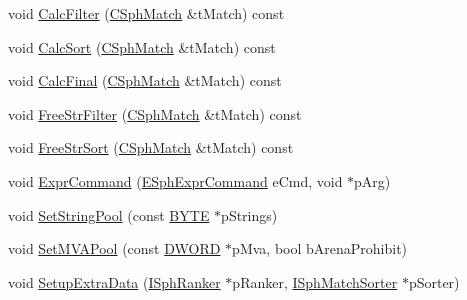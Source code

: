 \begin{DoxyCompactItemize}
\item 
void \hyperlink{classCSphQueryContext_a675421ba85a4cd0fee95ad9842b8ef3b}{Calc\-Filter} (\hyperlink{classCSphMatch}{C\-Sph\-Match} \&t\-Match) const 
\item 
void \hyperlink{classCSphQueryContext_af108a8e99fe50da4d1429d711d1f8456}{Calc\-Sort} (\hyperlink{classCSphMatch}{C\-Sph\-Match} \&t\-Match) const 
\item 
void \hyperlink{classCSphQueryContext_a9864d406b1394e87bea17c252c659ec2}{Calc\-Final} (\hyperlink{classCSphMatch}{C\-Sph\-Match} \&t\-Match) const 
\item 
void \hyperlink{classCSphQueryContext_a3ac926f928d2b575ea061e2f5f9f7d00}{Free\-Str\-Filter} (\hyperlink{classCSphMatch}{C\-Sph\-Match} \&t\-Match) const 
\item 
void \hyperlink{classCSphQueryContext_ab9c165d8b5335a73ae44d9215c873863}{Free\-Str\-Sort} (\hyperlink{classCSphMatch}{C\-Sph\-Match} \&t\-Match) const 
\item 
void \hyperlink{classCSphQueryContext_a87ab305ef3822402d8169a2967fb1ceb}{Expr\-Command} (\hyperlink{sphinxexpr_8h_a30be184fb07bd80c271360fc6094c818}{E\-Sph\-Expr\-Command} e\-Cmd, void $\ast$p\-Arg)
\item 
void \hyperlink{classCSphQueryContext_aca31066a630da7b8d58141f3e66e7fe9}{Set\-String\-Pool} (const \hyperlink{sphinxstd_8h_a4ae1dab0fb4b072a66584546209e7d58}{B\-Y\-T\-E} $\ast$p\-Strings)
\item 
void \hyperlink{classCSphQueryContext_abea6fdf546c1a7a38beb838020659e8b}{Set\-M\-V\-A\-Pool} (const \hyperlink{sphinxstd_8h_a798af1e30bc65f319c1a246cecf59e39}{D\-W\-O\-R\-D} $\ast$p\-Mva, bool b\-Arena\-Prohibit)
\item 
void \hyperlink{classCSphQueryContext_aaf23e4528a9aab552728a62c24eabae6}{Setup\-Extra\-Data} (\hyperlink{classISphRanker}{I\-Sph\-Ranker} $\ast$p\-Ranker, \hyperlink{classISphMatchSorter}{I\-Sph\-Match\-Sorter} $\ast$p\-Sorter)
\end{DoxyCompactItemize}
